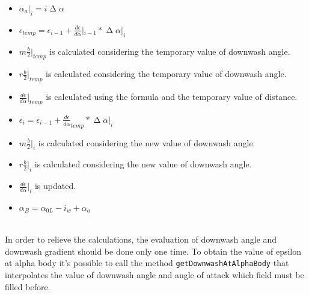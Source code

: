 \begin{enumerate}
\begin{itemize}
\item $\alpha_a|_i = i \upDelta \alpha$ 
\item $\epsilon_{temp}= \epsilon_{i-1} + \frac{d\epsilon}{d\alpha} |_{i-1} *  \upDelta \alpha |_i $%
\item  $m  \frac{b}{2}| _{temp} $  is calculated considering the temporary value of downwash angle.
\item  $r  \frac{b}{2}| _{temp} $  is calculated considering the temporary value of downwash angle.
\item $\frac{d\epsilon}{d\alpha}|_{temp}$  is calculated using the formula and the temporary value of distance.
\item $\epsilon_{i}=  \epsilon_{i-1} + \frac{d\epsilon}{d\alpha}_{temp} * \upDelta  \alpha|_i $ 
\item  $m  \frac{b}{2}| _{i} $  is calculated considering the new value of downwash angle.
\item  $r \frac{b}{2}| _{i} $  is calculated considering the new value of downwash angle.
\item $\frac{d\epsilon}{d\alpha}|_{i}$  is updated.
\item $\alpha_B =\alpha_{0L} - i_w + \alpha_a $ 
\end{itemize}

\end{enumerate}

\noindent \\
In order to relieve the calculations, the evaluation of downwash angle and downwash gradient should be done only one time. To obtain the value of epsilon at alpha body it's possible to call the method  \texttt{getDownwashAtAlphaBody} that interpolates the value of downwash angle and angle of attack which field must be filled before.\\ 




